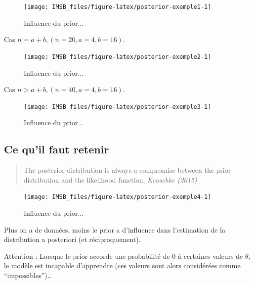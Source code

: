 \documentclass[
  a4paper,11pt,twoside,onecolumn,openright,final,oldfontcommands]{memoir}
\theoremstyle{definition}
\theoremstyle{definition}
\theoremstyle{definition}
\theoremstyle{definition}
\theoremstyle{remark}
\begin{document}
\begin{figure}[!htb]

{\centering \texttt{[image: IMSB\_files/figure-latex/posterior-exemple1-1]} 

}

\caption{Influence du prior...}\label{fig:posterior-exemple1}
\end{figure}

Cas \(n = a + b, (n = 20, a = 4, b = 16)\).

\begin{figure}[!htb]

{\centering \texttt{[image: IMSB\_files/figure-latex/posterior-exemple2-1]} 

}

\caption{Influence du prior...}\label{fig:posterior-exemple2}
\end{figure}

Cas \(n > a + b, (n = 40, a = 4, b = 16)\).

\begin{figure}[!htb]

{\centering \texttt{[image: IMSB\_files/figure-latex/posterior-exemple3-1]} 

}

\caption{Influence du prior...}\label{fig:posterior-exemple3}
\end{figure}

\hypertarget{ce-quil-faut-retenir}{%
\subsection{Ce qu'il faut retenir}\label{ce-quil-faut-retenir}}

\begin{quote}
The posterior distribution is always a compromise between the prior distribution and the likelihood function.
\emph{Kruschke (2015)}
\end{quote}

\begin{figure}[!htb]

{\centering \texttt{[image: IMSB\_files/figure-latex/posterior-exemple4-1]} 

}

\caption{Influence du prior...}\label{fig:posterior-exemple4}
\end{figure}

Plus on a de données, moins le prior a d'influence dans l'estimation de la distribution a posteriori (et réciproquement).

Attention : Lorsque le prior accorde une probabilité de 0 à certaines valeurs de \(\theta\), le modèle est incapable d'apprendre (ces valeurs sont alors considérées comme ``impossibles'')\ldots{}
\end{document}
